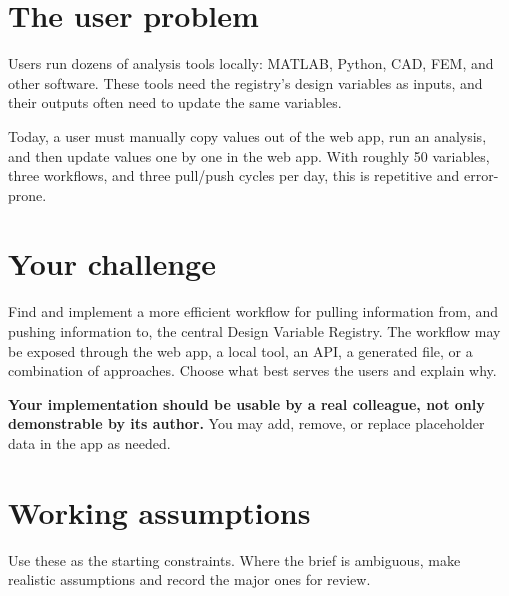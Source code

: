 \documentclass[10pt,a4paper]{article}
\newcommand{\callout}[1]{\noindent\colorbox{accentlight}{\parbox{\dimexpr\linewidth-2\fboxsep\relax}{\textcolor{ink}{#1}}}}
\begin{document}
\section{The user problem}
Users run dozens of analysis tools locally: MATLAB, Python, CAD, FEM, and other software. These tools need the registry's design variables as inputs, and their outputs often need to update the same variables.

\callout{Today, a user must manually copy values out of the web app, run an analysis, and then update values one by one in the web app. With roughly 50 variables, three workflows, and three pull/push cycles per day, this is repetitive and error-prone.}

\section{Your challenge}
Find and implement a more efficient workflow for pulling information from, and pushing information to, the central Design Variable Registry. The workflow may be exposed through the web app, a local tool, an API, a generated file, or a combination of approaches. Choose what best serves the users and explain why.

\textbf{Your implementation should be usable by a real colleague, not only demonstrable by its author.} You may add, remove, or replace placeholder data in the app as needed.

\section{Working assumptions}
Use these as the starting constraints. Where the brief is ambiguous, make realistic assumptions and record the major ones for review.
\end{document}
